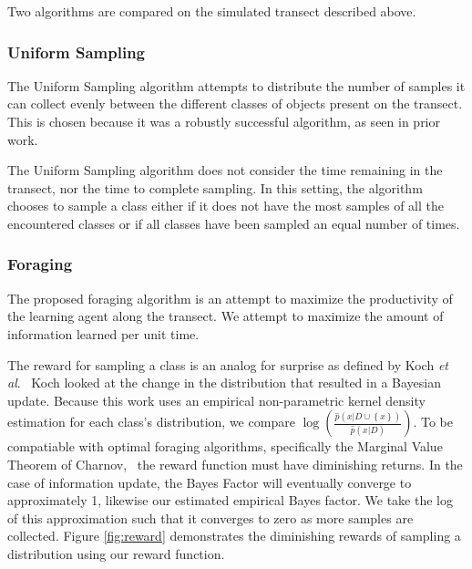 

Two algorithms are compared on the simulated transect described above.

\subsubsection{Uniform Sampling}

The Uniform Sampling algorithm attempts to distribute the number of samples it
can collect evenly between the different classes of objects present on the
transect.  This is chosen because it was a robustly successful algorithm, as
seen in prior work.~\cite{furlong2014sequential,furlong2014budgeting}

The Uniform Sampling algorithm does not consider the time remaining in the
transect, nor the time to complete sampling.  In this setting, the algorithm
chooses to sample a class either if it does not have the most samples of all
the encountered classes or if all classes have been sampled an equal number of times.

\subsubsection{Foraging}

The proposed foraging algorithm is an attempt to maximize the productivity of the learning agent along the transect.  We attempt to maximize the amount of information learned per unit time.

The reward for sampling a class is an analog for surprise as
defined by Koch \emph{et al}.~\cite{itti2009bayesian}  Koch looked at the change
in the distribution that resulted in a Bayesian update.  Because this work
uses an empirical non-parametric kernel density estimation for each class's distribution, we compare
$\log\left(\frac{\hat{p}(x|D\cup \left\{x\right\})}{\hat{p}(x|D)}\right)$.  To
be compatiable with optimal foraging algorithms, specifically the Marginal
Value Theorem of Charnov,~\cite{charnov1976optimal} the reward function must
have diminishing returns.  In the case of information update, the Bayes Factor
will eventually converge to approximately 1, likewise our estimated empirical
Bayes factor.  We take the log of this approximation such that it converges to
zero as more samples are collected.  Figure \ref{fig:reward} demonstrates the diminishing rewards of sampling a distribution using our reward function.


